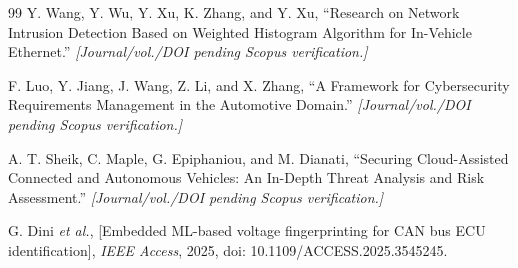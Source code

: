 \documentclass[journal]{IEEEtran}
\begin{document}
\begin{thebibliography}{99}
		 Y. Wang, Y. Wu, Y. Xu, K. Zhang, and Y. Xu, ``Research
		on Network Intrusion Detection Based on Weighted Histogram Algorithm
		for In-Vehicle Ethernet.'' \emph{[Journal/vol./DOI pending Scopus
			verification.]}
		
		 F. Luo, Y. Jiang, J. Wang, Z. Li, and X. Zhang, ``A
		Framework for Cybersecurity Requirements Management in the Automotive
		Domain.'' \emph{[Journal/vol./DOI pending Scopus verification.]}
		
		 A. T. Sheik, C. Maple, G. Epiphaniou, and M. Dianati,
		``Securing Cloud-Assisted Connected and Autonomous Vehicles: An
		In-Depth Threat Analysis and Risk Assessment.'' \emph{[Journal/vol./DOI
			pending Scopus verification.]}
		
		 G. Dini \emph{et al.}, [Embedded ML-based voltage
		fingerprinting for CAN bus ECU identification], \emph{IEEE Access}, 2025,
		doi: 10.1109/ACCESS.2025.3545245.
		
	\end{thebibliography}
	
\end{document}
